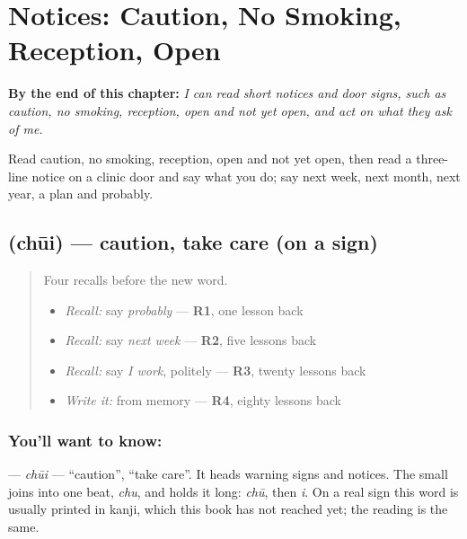 
\chapter{Notices: Caution, No Smoking, Reception, Open}
\label{ch:ja-notices-caution-no-smoking-reception-open}

\begin{chapteropening}
\textbf{By the end of this chapter:} \emph{I can read short notices and door signs, such as caution, no smoking, reception, open and not yet open, and act on what they ask of me.}

Read caution, no smoking, reception, open and not yet open, then read a three-line notice on a clinic door and say what you do; say next week, next month, next year, a plan and probably.
\end{chapteropening}

\section[\texorpdfstring{\ja{ちゅうい} (chūi)}{ちゅうい (chūi)}]{ (chūi) — caution, take care (on a sign)}

\label{lesson:JA-C142-chuui}



\begin{quote}
Four recalls before the new word.

\begin{itemize}
\raggedright
  \item \emph{Recall:} say \emph{probably} — \textbf{R1}, one lesson back
  \item \emph{Recall:} say \emph{next week} — \textbf{R2}, five lessons back
  \item \emph{Recall:} say \emph{I work}, politely — \textbf{R3}, twenty lessons back
  \item \emph{Write it:} \textbf{} from memory — \textbf{R4}, eighty lessons back
\end{itemize}
\end{quote}

\subsection*{You'll want to know: }
\textbf{} — \emph{chūi} — \textquotedblleft{}caution\textquotedblright{}, \textquotedblleft{}take care\textquotedblright{}. It heads warning signs and notices. The small \textbf{} joins \textbf{} into one beat, \emph{chu}, and \textbf{} holds it long: \emph{chū}, then \emph{i}. On a real sign this word is usually printed in kanji, which this book has not reached yet; the reading is the same.

